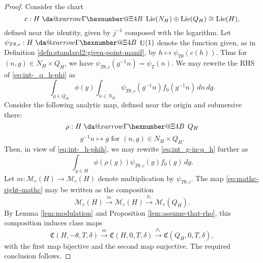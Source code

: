 \documentclass[reqno]{amsart}
\makeatletter
\newcommand*{\da@rightarrow}{\mathchar"0\hexnumber@\symAMSa 4B }
\newcommand*{\xdashrightarrow}[2][]{%
  \mathrel{%
    \mathpalette{\da@xarrow{#1}{#2}{}\da@rightarrow{\,}{}}{}%
  }%
}
\newcommand*{\da@xarrow}[7]{%
  \sbox0{$\ifx#7\scriptstyle\scriptscriptstyle\else\scriptstyle\fi#5#1#6\m@th$}%
  \sbox2{$\ifx#7\scriptstyle\scriptscriptstyle\else\scriptstyle\fi#5#2#6\m@th$}%
  \sbox4{$#7\dabar@\m@th$}%
  \dimen@=\wd0 %
  \ifdim\wd2 >\dimen@
    \dimen@=\wd2 %
  \fi
  \count@=2 %
  \def\da@bars{\dabar@\dabar@}%
  \@whiledim\count@\wd4<\dimen@\do{%
    \advance\count@\@ne
    \expandafter\def\expandafter\da@bars\expandafter{%
      \da@bars
      \dabar@ 
    }%
  }%
  \mathrel{#3}%
  \mathrel{%
    \mathop{\da@bars}\limits
    \ifx\\#1\\%
    \else
      _{\copy0}%
    \fi
    \ifx\\#2\\%
    \else
      ^{\copy2}%
    \fi
  }%
  \mathrel{#4}%
}
\DeclareMathOperator{\U}{U}
\DeclareMathOperator{\Lie}{Lie}
\theoremstyle{plain} \newtheorem{theorem} {Theorem}
\theoremstyle{definition} \newtheorem{definition} [theorem] {Definition}
\theoremstyle{itplain} %
\numberwithin{equation}{section}
\numberwithin{theorem}{section}
\makeatother
\begin{document}
\begin{proof}
  Consider the chart
  \begin{equation*}
    c : H \xdashrightarrow{} \Lie(N_H) \oplus  \Lie(Q_H) \cong \Lie(H),
  \end{equation*}
  defined near the identity, given by $j^{-1}$ composed with the logarithm.  Let $\psi_{T \theta, c} : H \xdashrightarrow{} \U(1)$ denote the function given, as in
  Definition \ref{defn:standard2:given-point-manif}, by $h \mapsto \psi_{T \theta}(c(h))$.  Thus for $(n,g) \in N_H \times Q_H$, we have $\psi_{T \theta, c}(g^{-1} n) = \psi_T(n)$.  We may rewrite the RHS of \eqref{eq:int-_q_h-phi} as
  \begin{equation}\label{eq:int_g-in-q_h}
    \int_{g \in Q_H} \phi(g) \int _{n \in N_H} \psi_{T \theta, c}(g^{-1} n) f_0(g^{-1} n) \, d n \, d g.
  \end{equation}
  Consider the following analytic map, defined near the origin and submersive there:
  \begin{equation*}
    \rho : H \xdashrightarrow{} Q_H
  \end{equation*}
  \begin{equation*}
    g^{-1} n \mapsto g \text{ for } (n,g) \in N_H \times Q_H.
  \end{equation*}
  Then, in view of \eqref{eq:int-_h-phih},  we may rewrite \eqref{eq:int_g-in-q_h} further as
  \begin{equation*}
    \int _{g \in H} \phi(\rho(g)) \psi_{T \theta , c}(g) f_0(g) \, d g.
  \end{equation*}
  Let $m : \mathcal{M}_c(H) \rightarrow \mathcal{M}_c(H)$ denote multiplication by $\psi_{T \theta, c}$.  The map \eqref{eq:mathc-right-mathc} may be written as the composition
  \begin{equation*}
    \mathcal{M}_c(H) \xrightarrow{m} \mathcal{M}_c(H) \xrightarrow{\rho_*} \mathcal{M}_c(Q_H).
  \end{equation*}
  By Lemma \ref{lem:modulation} and Proposition \ref{lem:assume-that-rho}, this composition induces class maps
  \begin{equation*}
    \mathfrak{C}(H,-\theta,T,\delta) \xrightarrow{m} \mathfrak{C}(H,0,T,\delta) \xrightarrow{\rho_*} \mathfrak{C}(Q_H,0,T,\delta),
  \end{equation*}
  with the first map bijective and the second map surjective.  The required conclusion follows.
\end{proof}
\end{document}
